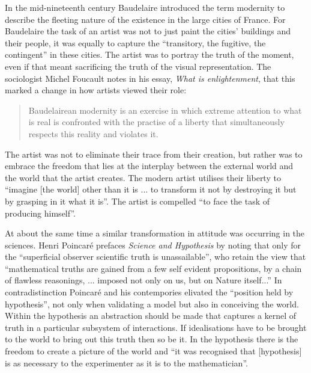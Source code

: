 In the mid-nineteenth century Baudelaire introduced the term modernity 
to describe the fleeting nature of the existence in the large cities of France.
For Baudelaire the task of an artist was not to just paint the cities' buildings and their people,  
it was equally to capture the ``transitory, the fugitive, the contingent''\cite{BoudelairePainterofModernLife} in these cities.
The artist was to portray the truth of the moment, even if that meant sacrificing the truth of the visual representation.
The sociologist Michel Foucault notes in his essay, {\em What is enlightenment}\cite{FoucaultWhatIsEnlightenment}, that this marked a change in how artists viewed their role:
\begin{quote}
  Baudelairean modernity is an exercise in which extreme attention to
  what is real is confronted with the practise of a liberty that
  simultaneously respects this reality and violates it.
\end{quote}
The artist was not to eliminate their trace from their creation,
but rather was to embrace the freedom
that lies at the interplay between the external world  and the world
that the artist creates.  The modern artist utilises their liberty to ``imagine 
[the world] other than it is ... to transform it not by destroying it but by grasping in it
what it is''. 
The artist is compelled ``to face the task of producing himself''\cite{FoucaultWhatIsEnlightenment}.


At about the same time a similar transformation in attitude was occurring in the sciences.
Henri Poincar{\'e} prefaces {\em Science and Hypothesis}\cite*{Poincare1902} by noting
that only for the ``superficial observer scientific truth is unassailable'',
who retain the view that %
``mathematical truths are gained from a few self evident propositions,
 by a chain of flawless reasonings, ... imposed not only on us, but on Nature itself...''
%
In contradistinction Poincar{\'e} and his contempories elivated the ``position held by hypothesis'',
not only when validating a model but also in conceiving the world.
Within the hypothesis an abstraction should be made that captures a kernel of truth in a particular subsystem of interactions.
If idealisations have to be brought to the world to bring out this truth then so be it.
In the hypothesis there is the freedom to create a picture of the world
and ``it was recognised that [hypothesis] is as necessary to the experimenter as it is to the mathematician''.


